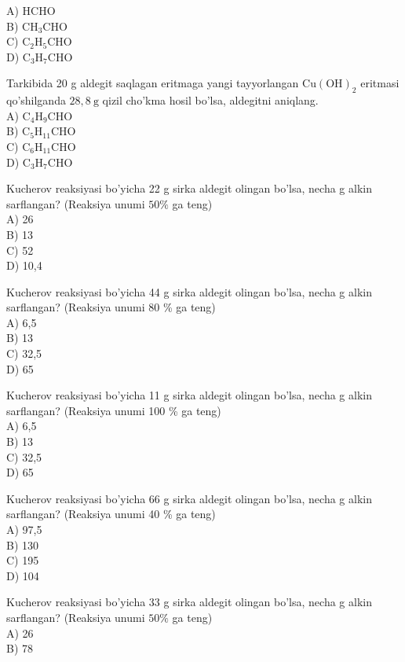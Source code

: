 A) HCHO\\
B) $\mathrm{CH}_{3} \mathrm{CHO}$\\
C) $\mathrm{C}_{2} \mathrm{H}_{5} \mathrm{CHO}$\\
D) $\mathrm{C}_{3} \mathrm{H}_{7} \mathrm{CHO}$
  \item Tarkibida 20 g aldegit saqlagan eritmaga yangi tayyorlangan $\mathrm{Cu}(\mathrm{OH})_{2}$ eritmasi qo'shilganda $28,8 \mathrm{~g}$ qizil cho'kma hosil bo'lsa, aldegitni aniqlang.\\
A) $\mathrm{C}_{4} \mathrm{H}_{9} \mathrm{CHO}$\\
B) $\mathrm{C}_{5} \mathrm{H}_{11} \mathrm{CHO}$\\
C) $\mathrm{C}_{6} \mathrm{H}_{11} \mathrm{CHO}$\\
D) $\mathrm{C}_{3} \mathrm{H}_{7} \mathrm{CHO}$
  \item Kucherov reaksiyasi bo'yicha 22 g sirka aldegit olingan bo'lsa, necha g alkin sarflangan? (Reaksiya unumi $50 \%$ ga teng)\\
A) 26\\
B) 13\\
C) 52\\
D) 10,4
  \item Kucherov reaksiyasi bo'yicha 44 g sirka aldegit olingan bo'lsa, necha g alkin sarflangan? (Reaksiya unumi 80 \% ga teng)\\
A) 6,5\\
B) 13\\
C) 32,5\\
D) 65
  \item Kucherov reaksiyasi bo'yicha 11 g sirka aldegit olingan bo'lsa, necha g alkin sarflangan? (Reaksiya unumi 100 \% ga teng)\\
A) 6,5\\
B) 13\\
C) 32,5\\
D) 65
  \item Kucherov reaksiyasi bo'yicha 66 g sirka aldegit olingan bo'lsa, necha g alkin sarflangan? (Reaksiya unumi 40 \% ga teng)\\
A) 97,5\\
B) 130\\
C) 195\\
D) 104
  \item Kucherov reaksiyasi bo'yicha 33 g sirka aldegit olingan bo'lsa, necha g alkin sarflangan? (Reaksiya unumi $50 \%$ ga teng)\\
A) 26\\
B) 78\\
